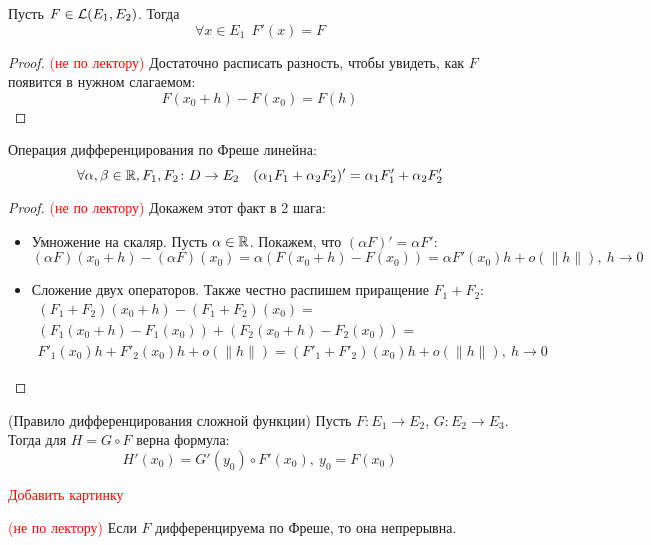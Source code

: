 \begin{proposition}
	Пусть $F \in \mathcal{L}(E_1, E_2)$. Тогда
	\[
		\forall x \in E_1\ \ F'(x) = F
	\]
\end{proposition}

\begin{proof} \textcolor{red}{(не по лектору)}
	Достаточно расписать разность, чтобы увидеть, как $F$ появится в нужном слагаемом:
	\[
		F(x_0 + h) - F(x_0) = F(h)
	\]
\end{proof}

\begin{proposition}
	Операция дифференцирования по Фреше линейна:
	\[
		\forall \alpha, \beta \in \mathbb{R}, F_1, F_2 \colon D \to E_2\ \ \ (\alpha_1F_1 + \alpha_2F_2)' = \alpha_1F'_1 + \alpha_2F'_2
	\]
\end{proposition}

\begin{proof} \textcolor{red}{(не по лектору)}
	Докажем этот факт в 2 шага:
	\begin{itemize}
		\item Умножение на скаляр. Пусть $\alpha \in \mathbb{R}$. Покажем, что $(\alpha F)' = \alpha F'$:
		\[
			(\alpha F)(x_0 + h) - (\alpha F)(x_0) = \alpha(F(x_0 + h) - F(x_0)) = \alpha F'(x_0) h + o(\|h\|),\ h \to 0
		\]
		
		\item Сложение двух операторов. Также честно распишем приращение $F_1 + F_2$:
		\begin{multline*}
			(F_1 + F_2)(x_0 + h) - (F_1 + F_2)(x_0) =
			\\
			(F_1(x_0 + h) - F_1(x_0)) + (F_2(x_0 + h) - F_2(x_0)) =
			\\
			F'_1(x_0)h + F'_2(x_0)h + o(\|h\|) = (F'_1 + F'_2)(x_0)h + o(\|h\|),\ h \to 0
		\end{multline*}
	\end{itemize}
\end{proof}

\begin{theorem} (Правило дифференцирования сложной функции)
	Пусть $F \colon E_1 \to E_2$, $G \colon E_2 \to E_3$. Тогда для $H = G \circ F$ верна формула:
	\[
		H'(x_0) = G'(y_0) \circ F'(x_0),\ y_0 = F(x_0)
	\]
\end{theorem}

\textcolor{red}{Добавить картинку}

\begin{proposition} \textcolor{red}{(не по лектору)}
	Если $F$ дифференцируема по Фреше, то она непрерывна.
\end{proposition}

